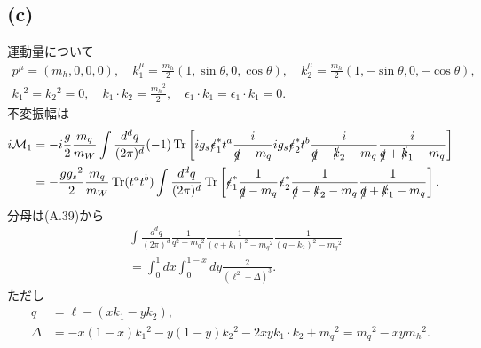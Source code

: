 \subsection{(c)}
\begin{center}
\end{center}
運動量について
\begin{gather*}
  p^\mu = (m_h, 0, 0, 0) , \quad
  k_1^\mu = \frac{m_h}{2} (1, \sin\theta, 0, \cos\theta) , \quad
  k_2^\mu = \frac{m_h}{2} (1, -\sin\theta, 0, -\cos\theta) , \\
  k_1{}^2 = k_2{}^2 = 0 , \quad
  k_1 \cdot k_2 = \frac{m_h{}^2}{2} , \quad
  \epsilon_1 \cdot k_1 = \epsilon_1 \cdot k_1 = 0 .
\end{gather*}
不変振幅は
\begin{align*}
  i\mathcal{M}_1 &= -i \frac{g}{2} \frac{m_q}{m_W} \int\frac{d^dq}{(2\pi)^d} (-1)
  \operatorname{Tr} \left[ ig_s \slashed\epsilon_1^\ast t^a \frac{i}{\slashed{q}-m_q} ig_s \slashed\epsilon_2^\ast t^b \frac{i}{\slashed{q}-\slashed{k}_2-m_q} \frac{i}{\slashed{q}+\slashed{k}_1-m_q} \right] \\
  &= - \frac{gg_s{}^2}{2} \frac{m_q}{m_W} \operatorname{Tr}(t^at^b) \int\frac{d^dq}{(2\pi)^d}
  \operatorname{Tr} \left[ \slashed\epsilon_1^\ast \frac{1}{\slashed{q}-m_q} \slashed\epsilon_2^\ast \frac{1}{\slashed{q}-\slashed{k}_2-m_q} \frac{1}{\slashed{q}+\slashed{k}_1-m_q} \right] .
\end{align*}
分母は(A.39)から
\begin{align*}
  & \int\frac{d^dq}{(2\pi)^d} \frac{1}{q^2-m_q{}^2} \frac{1}{(q+k_1)^2-m_q{}^2} \frac{1}{(q-k_2)^2-m_q{}^2} \\
  &= \int_0^1 dx \int_0^{1-x} dy \frac{2}{(\ell^2-\Delta)^3} .
\end{align*}
ただし
\begin{align*}
  q &= \ell - (xk_1 - yk_2) , \\
  \Delta &= - x(1-x) k_1{}^2 - y(1-y) k_2{}^2 - 2xyk_1\cdot k_2 + m_q{}^2 = m_q{}^2 - xy m_h{}^2 .
\end{align*}
